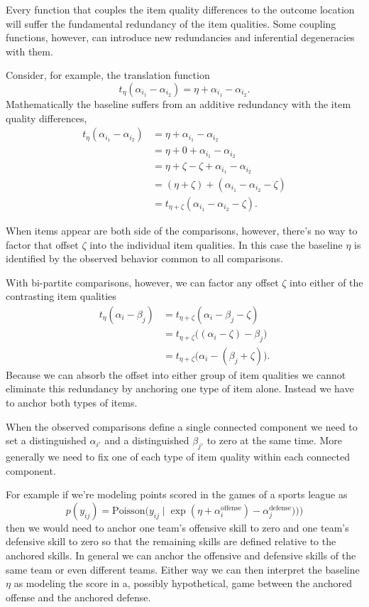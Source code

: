 \documentclass[
  letterpaper,
  DIV=11,
  numbers=noendperiod]{scrartcl}
\begin{document}
Every function that couples the item quality differences to the outcome
location will suffer the fundamental redundancy of the item qualities.
Some coupling functions, however, can introduce new redundancies and
inferential degeneracies with them.

Consider, for example, the translation function \[
t_{\eta} ( \alpha_{i_{1}} - \alpha_{i_{2}} )
=
\eta + \alpha_{i_{1}} - \alpha_{i_{2}}.
\] Mathematically the baseline suffers from an additive redundancy with
the item quality differences, \begin{align*}
t_{\eta} ( \alpha_{i_{1}} - \alpha_{i_{2}} )
&=
\eta + \alpha_{i_{1}} - \alpha_{i_{2}}
\\
&=
\eta + 0 + \alpha_{i_{1}} - \alpha_{i_{2}}
\\
&=
\eta + \zeta - \zeta + \alpha_{i_{1}} - \alpha_{i_{2}}
\\
&=
(\eta + \zeta) + (\alpha_{i_{1}} - \alpha_{i_{2}} - \zeta)
\\
&=
t_{\eta + \zeta} (\alpha_{i_{1}} - \alpha_{i_{2}} - \zeta ).
\end{align*}

When items appear are both side of the comparisons, however, there's no
way to factor that offset \(\zeta\) into the individual item qualities.
In this case the baseline \(\eta\) is identified by the observed
behavior common to all comparisons.

With bi-partite comparisons, however, we can factor any offset \(\zeta\)
into either of the contrasting item qualities \begin{align*}
t_{\eta} ( \alpha_{i} - \beta_{j} )
&=
t_{\eta + \zeta} ( \alpha_{i} - \beta_{j} - \zeta )
\\
&=
t_{\eta + \zeta} \big( (\alpha_{i} - \zeta) - \beta_{j} \big)
\\
&=
t_{\eta + \zeta} \big( \alpha_{i} - (\beta_{j} + \zeta) \big).
\end{align*} Because we can absorb the offset into either group of item
qualities we cannot eliminate this redundancy by anchoring one type of
item alone. Instead we have to anchor both types of items.

When the observed comparisons define a single connected component we
need to set a distinguished \(\alpha_{i'}\) and a distinguished
\(\beta_{j'}\) to zero at the same time. More generally we need to fix
one of each type of item quality within each connected component.

For example if we're modeling points scored in the games of a sports
league as \[
p(y_{ij} ) =
\mathrm{Poisson}\big( y_{ij} \mid
                      \exp(  \eta
                           + \alpha_{i}^{\mathrm{offense}})
                           - \alpha_{j}^{\mathrm{defense}})
                          )
                \big)
\] then we would need to anchor one team's offensive skill to zero and
one team's defensive skill to zero so that the remaining skills are
defined relative to the anchored skills. In general we can anchor the
offensive and defensive skills of the same team or even different teams.
Either way we can then interpret the baseline \(\eta\) as modeling the
score in a, possibly hypothetical, game between the anchored offense and
the anchored defense.
\end{document}
